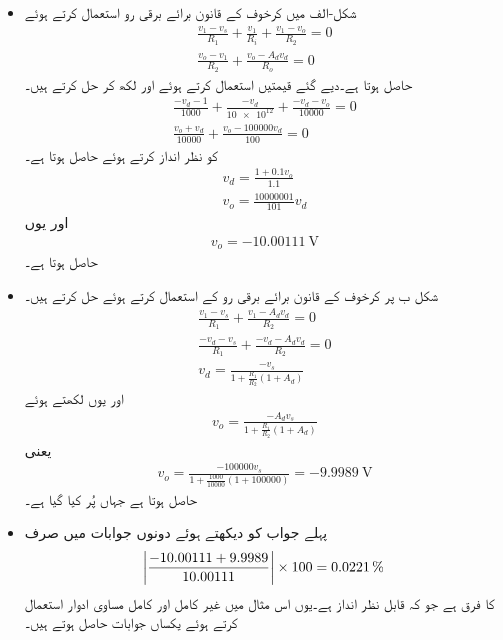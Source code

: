 \begin{itemize}
\item
شکل-الف میں کرخوف کے قانون برائے برقی رو استعمال کرتے ہوئے
\begin{align*}
\frac{v_1-v_s}{R_1}+\frac{v_1}{R_i}+\frac{v_1-v_o}{R_2}=0\\
\frac{v_o-v_1}{R_2}+\frac{v_o-A_d v_d}{R_o}=0
\end{align*}
حاصل ہوتا ہے۔دیے گئے قیمتیں استعمال کرتے ہوئے اور  لکھ کر حل کرتے ہیں۔
\begin{align*}
\frac{-v_d-1}{\num{1000}}+\frac{-v_d}{\num{10e12}}+\frac{-v_d-v_o}{\num{10000}}=0\\
\frac{v_o+v_d}{\num{10000}}+\frac{v_o-\num{100000} v_d}{\num{100}}=0
\end{align*}
 کو نظر انداز کرتے ہوئے  حاصل ہوتا ہے۔
\begin{align*}
v_d=\frac{1+0.1 v_o}{1.1}\\
v_o=\frac{\num{10000001}}{101} v_d
\end{align*}
 اور یوں
\begin{align*}
v_o=\SI{-10.00111}{\volt}
\end{align*}
حاصل ہوتا ہے۔
\item
شکل  ب پر کرخوف کے قانون برائے برقی رو کے استعمال کرتے ہوئے حل کرتے ہیں۔
\begin{align*}
\frac{v_1-v_s}{R_1}+\frac{v_1-A_d v_d}{R_2}=0\\
\frac{-v_d-v_s}{R_1}+\frac{-v_d-A_d v_d}{R_2}=0\\
v_d=\frac{-v_s}{1+\frac{R_1}{R_2}\left(1+A_d \right)}
\end{align*}
اور یوں  لکھتے ہوئے
\begin{align} \label{مساوات_حسابی_کامل_مثال_حل}
v_o=\frac{-A_d v_s}{1+\frac{R_1}{R_2}\left(1+A_d \right)}
\end{align}
یعنی
\begin{align*}
v_o=\frac{-\num{100000} v_s}{1+\frac{\num{1000}}{\num{10000}}\left(1+\num{100000} \right)}=\SI{-9.9989}{\volt}
\end{align*}
حاصل ہوتا ہے جہاں  پُر کیا گیا ہے۔
\item
پہلے جواب کو  دیکھتے ہوئے دونوں جوابات میں صرف
\begin{align*}
\abs{\frac{-10.00111+9.9989}{10.00111}} \times 100=\SI{0.0221}{\percent}
\end{align*}
کا فرق ہے جو کہ قابل نظر انداز ہے۔یوں اس مثال میں غیر کامل اور کامل مساوی ادوار استعمال کرتے ہوئے یکساں جوابات حاصل ہوتے ہیں۔
\end{itemize}

